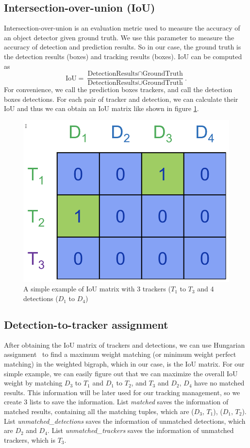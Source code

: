 \documentclass[10pt,twocolumn,letterpaper]{article}
\begin{document}
\subsection{Intersection-over-union (IoU)}
Intersection-over-union is an evaluation metric used to measure the accuracy of an object detector given ground truth. We use this parameter to measure the accuracy of detection and prediction results. So in our case, the ground truth is the detection results (boxes) and tracking results (boxes). IoU can be computed as 
\begin{equation*}
\mbox{IoU} = \frac{\mbox{DetectionResults} \cap \mbox{GroundTruth}}{\mbox{DetectionResults} \cup \mbox{GroundTruth}}.
\end{equation*}
For convenience, we call the prediction boxes trackers, and call the detection boxes detections. For each pair of tracker and detection, we can calculate their IoU and thus we can obtain an IoU matrix like shown in figure \ref{fig:3_1_1}.

\begin{figure}[t]
\begin{center}
   \includegraphics[width=0.4\linewidth]{3_1_1.png}
\end{center}
   \caption{A simple example of IoU matrix with 3 trackers ($T_1$ to $T_3$ and 4 detections ($D_1$ to $D_4$)}
\label{fig:3_1_1}
\end{figure}

\subsection{Detection-to-tracker assignment}
After obtaining the IoU matrix of trackers and detections, we can use Hungarian assignment~\cite{Hungarian1, Hungarian2} to find a maximum weight matching (or minimum weight perfect matching) in the weighted bigraph, which in our case, is the IoU matrix. For our simple example, we can easily figure out that we can maximize the overall IoU weight by matching $D_3$ to $T_1$ and $D_1$ to $T_2$, and $T_3$ and $D_2$, $D_4$ have no matched results. This information will be later used for our tracking management, so we create 3 lists to save the information. List \emph{matched} saves the information of matched results, containing all the matching tuples, which are ($D_3$, $T_1$), ($D_1$, $T_2$). List \emph{unmatched\_detections} saves the information of unmatched detections, which are $D_2$ and $D_4$. List \emph{unmatched\_trackers} saves the information of unmatched trackers, which is $T_3$.
\end{document}
